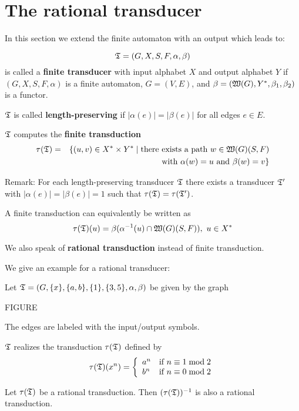 \section{The rational transducer}

In this section we extend the finite automaton with an output which leads to:

\begin{definition}
\[ \mbox{$\mathfrak{T}$} = (G, X, S, F, \alpha, \beta) \] is called a {\bf finite transducer}
with input alphabet $X$ and output alphabet $Y$ if $(G, X, S, F, \alpha)$ is a
finite automaton, $G = (V, E)$, and $\beta = (\mbox{$\mathfrak{W}(G)$}, Y^*, \beta_1,
\beta_2)$ is a functor.
\end{definition}

$\mbox{$\mathfrak{T}$}$ is called {\bf length-preserving} if $|\alpha(e)| = |\beta(e)|$ for all
edges $e \in E$.

$\mbox{$\mathfrak{T}$}$ computes the {\bf finite transduction}
\begin{eqnarray*}
\tau(\mbox{$\mathfrak{T}$}) & = & \{ (u, v) \in X^* \times Y^* \mid \mbox{there
exists a path } w \in \mbox{$\mathfrak{W}(G)$}(S, F) \\
& &  \mbox{ with } \alpha(w) = u \mbox{ and } \beta(w) = v \}
\end{eqnarray*}

Remark: For each length-preserving transducer $\mbox{$\mathfrak{T}$}$ there exists a
transducer $\mbox{$\mathfrak{T'}$}$ with $|\alpha(e)| = |\beta(e)| = 1$ such that
$\tau(\mbox{$\mathfrak{T}$}) = \tau(\mbox{$\mathfrak{T'}$})$.

A finite transduction can equivalently be written as 
\[ \tau(\mbox{$\mathfrak{T}$})(u) = \beta(\alpha^{-1}(u) \cap \mbox{$\mathfrak{W}(G)$}(S, F)),\ u \in X^* \]

We also speak of {\bf rational transduction} instead of finite transduction.

We give an example for a rational transducer:

Let $\mbox{$\mathfrak{T}$} = (G, \mbox{$\{x\}$}, \mbox{$\{a, b\}$}, \mbox{$\{1\}$}, \mbox{$\{3, 5\}$}, \alpha,
\beta)$ be given by the graph

FIGURE

The edges are labeled with the input/output symbols.

$\mbox{$\mathfrak{T}$}$ realizes the transduction $\tau(\mbox{$\mathfrak{T}$})$ defined by
\[ \tau(\fa{T})(x^n) = \left\{ 
\begin{array}{l@{\quad}l}
a^n & \mbox{if } n \equiv 1 \bmod 2 \\
b^n & \mbox{if } n \equiv 0 \bmod 2
\end{array}
\right. \]

\begin{lemma}
Let $\tau(\mbox{$\mathfrak{T}$})$ be a rational transduction. Then $(\tau(\mbox{$\mathfrak{T}$}))^{-1}$ is
also a rational transduction.
\end{lemma}

